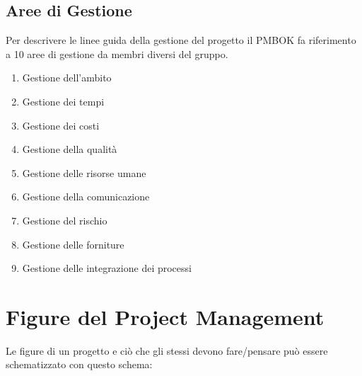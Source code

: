\documentclass{report}
\begin{document}
\subsection{Aree di Gestione}
Per descrivere le linee guida della gestione del progetto il PMBOK fa riferimento a 10 aree di gestione da membri diversi del gruppo.
\begin{enumerate}
    \item Gestione dell'ambito
    \item Gestione dei tempi
    \item Gestione dei costi
    \item Gestione della qualità
    \item Gestione delle risorse umane
    \item Gestione della comunicazione
    \item Gestione del rischio
    \item Gestione delle forniture
    \item Gestione delle integrazione dei processi
\end{enumerate}

\section{Figure del Project Management}

Le figure di un progetto e ciò che gli stessi devono fare/pensare può essere schematizzato con questo schema:
\end{document}

